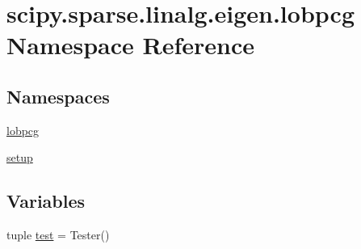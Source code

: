 \hypertarget{namespacescipy_1_1sparse_1_1linalg_1_1eigen_1_1lobpcg}{}\section{scipy.\+sparse.\+linalg.\+eigen.\+lobpcg Namespace Reference}
\label{namespacescipy_1_1sparse_1_1linalg_1_1eigen_1_1lobpcg}
\subsection*{Namespaces}
\begin{DoxyCompactItemize}
\item 
 \hyperlink{namespacescipy_1_1sparse_1_1linalg_1_1eigen_1_1lobpcg_1_1lobpcg}{lobpcg}
\item 
 \hyperlink{namespacescipy_1_1sparse_1_1linalg_1_1eigen_1_1lobpcg_1_1setup}{setup}
\end{DoxyCompactItemize}
\subsection*{Variables}
\begin{DoxyCompactItemize}
\item 
tuple \hyperlink{namespacescipy_1_1sparse_1_1linalg_1_1eigen_1_1lobpcg_aed10e2e58b3041c33747b93d50fee16d}{test} = Tester()
\end{DoxyCompactItemize}


